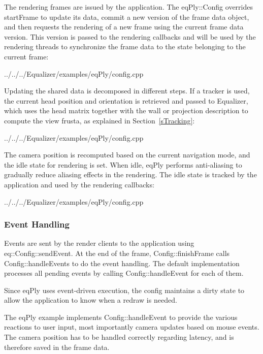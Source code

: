 \documentclass[10pt,a4]{scrartcl}
\newcommand{\sref}[1]{Section~\ref{#1}}
\begin{document}
The rendering frames are issued by the application. The \textsf{eqPly::Config}
overrides \textsf{startFrame} to update its data, commit a new version of the
frame data object, and then requests the rendering of a new frame using the
current frame data version. This version is passed to the rendering callbacks
and will be used by the rendering threads to synchronize the frame data to the
state belonging to the current frame:

{\footnotesize
  {../../../Equalizer/examples/eqPly/config.cpp}}

Updating the shared data is decomposed in different steps. If a tracker is used,
the current head position and orientation is retrieved and passed to Equalizer,
which uses the head matrix together with the wall or projection description to
compute the view frusta, as explained in \sref{sTracking}:

{\footnotesize
  {../../../Equalizer/examples/eqPly/config.cpp}}

The camera position is recomputed based on the current navigation mode, and the
idle state for rendering is set. When idle, \textsf{eqPly} performs
anti-aliasing to gradually reduce aliasing effects in the rendering. The idle
state is tracked by the application and used by the rendering callbacks:

{\footnotesize
  {../../../Equalizer/examples/eqPly/config.cpp}}


\subsubsection{Event Handling}

Events are sent by the render clients to the application using
\textsf{eq::Config::sendEvent}. At the end of the frame,
\textsf{Config::finishFrame} calls \textsf{Config::handleEvents} to do
the event handling. The default implementation processes all pending
events by calling \textsf{Config::handleEvent} for each of them.

Since \textsf{eqPly} uses event-driven execution, the config maintains a
dirty state to allow the application to know when a redraw is needed.

The \textsf{eqPly} example implements \textsf{Config::hand\-le\-Event}
to provide the various reactions to user input, most importantly camera
updates based on mouse events. The camera position has to be handled
correctly regarding latency, and is therefore saved in the frame data.
\end{document}
